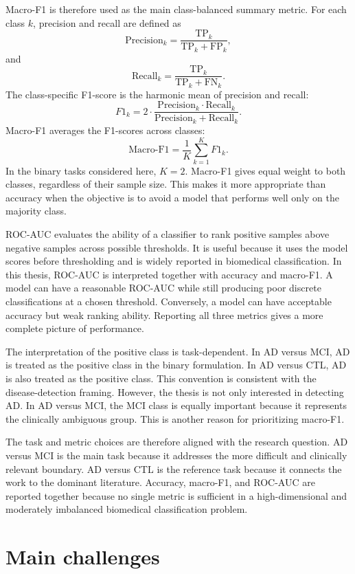Macro-F1 is therefore used as the main class-balanced summary metric. For each class \(k\), precision and recall are defined as
\[
    \mathrm{Precision}_k =
    \frac{\mathrm{TP}_k}{\mathrm{TP}_k+\mathrm{FP}_k},
\]
and
\[
    \mathrm{Recall}_k =
    \frac{\mathrm{TP}_k}{\mathrm{TP}_k+\mathrm{FN}_k}.
\]
The class-specific F1-score is the harmonic mean of precision and recall:
\[
    F1_k =
    2 \cdot
    \frac{\mathrm{Precision}_k \cdot \mathrm{Recall}_k}
    {\mathrm{Precision}_k + \mathrm{Recall}_k}.
\]
Macro-F1 averages the F1-scores across classes:
\[
    \mathrm{Macro\mbox{-}F1} =
    \frac{1}{K}\sum_{k=1}^{K} F1_k.
\]
In the binary tasks considered here, \(K=2\). Macro-F1 gives equal weight to both classes, regardless of their sample size. This makes it more appropriate than accuracy when the objective is to avoid a model that performs well only on the majority class.

ROC-AUC evaluates the ability of a classifier to rank positive samples above negative samples across possible thresholds. It is useful because it uses the model scores before thresholding and is widely reported in biomedical classification. In this thesis, ROC-AUC is interpreted together with accuracy and macro-F1. A model can have a reasonable ROC-AUC while still producing poor discrete classifications at a chosen threshold. Conversely, a model can have acceptable accuracy but weak ranking ability. Reporting all three metrics gives a more complete picture of performance.

The interpretation of the positive class is task-dependent. In AD versus MCI, AD is treated as the positive class in the binary formulation. In AD versus CTL, AD is also treated as the positive class. This convention is consistent with the disease-detection framing. However, the thesis is not only interested in detecting AD. In AD versus MCI, the MCI class is equally important because it represents the clinically ambiguous group. This is another reason for prioritizing macro-F1.

The task and metric choices are therefore aligned with the research question. AD versus MCI is the main task because it addresses the more difficult and clinically relevant boundary. AD versus CTL is the reference task because it connects the work to the dominant literature. Accuracy, macro-F1, and ROC-AUC are reported together because no single metric is sufficient in a high-dimensional and moderately imbalanced biomedical classification problem.

\section{Main challenges}
\label{sec:main-challenges}

